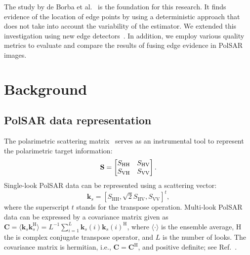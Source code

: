 \documentclass{article}
\begin{document}
The study by de Borba et al.~\cite{DeBorba2020} is the foundation for this research. 
It finds evidence of the location of edge points by using a deterministic approach that does not take into account the variability of the estimator. 
We extended this investigation using new edge detectors~\cite{Shi2020,Xiang2016}. 
In addition, we employ various quality metrics to evaluate and compare the results of fusing edge evidence in PolSAR images.

\vspace{-0.2cm}
\section{Background}
\vspace{-0.2cm}
\subsection{PolSAR data representation}\vspace{-0.2cm}
The polarimetric scattering matrix~\cite{Lee2017} serves as an instrumental tool to represent the polarimetric target information:
\vspace{-0.2cm}
\begin{equation}
 \mathbf{S} = \begin{bmatrix}
S_{\text{HH}} & S_{\text{HV}} \\
S_{\text{VH}} & S_{\text{VV}}
\end{bmatrix}.  
\label{E:a1}\vspace{-0.2cm}
\end{equation}
Single-look PolSAR data can be represented using a scattering vector:
\begin{equation}
\mathbf{k}_s=[S_{\text{HH}}, \sqrt{2}S_{\text{HV}}, S_{\text{VV}} ]^t,
\label{E:21}%
\end{equation}
where  the superscript $t$ stands for the transpose operation. 
Multi‑look PolSAR data can be expressed  by a covariance matrix  given as 
$\mathbf{C}=\langle\mathbf{k}_s\mathbf{k}_s^\text{H} \rangle= {L}^{-1} \sum_{i=1}^{L} \mathbf{k}_s(i)\mathbf{k}_s(i)^\text{H}$, where $\langle \cdot \rangle$ is the ensemble average, $\text{H}$  the is complex conjugate transpose operator, and $L$ is the number of looks.
The covariance matrix is hermitian, i.e., $\mathbf{C}= \mathbf{C}^\text{H}$, and positive definite; see Ref.~\cite{Qin2022}.
\end{document}
